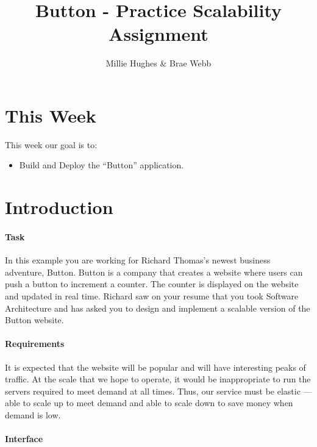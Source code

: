 \documentclass{csse4400}
\title{Button - Practice Scalability Assignment}
\author{Millie Hughes \& Brae Webb}
\date{\week{0}}
\begin{document}
\maketitle


\section{This Week}
This week our goal is to:
\begin{itemize}
  \item Build and Deploy the ``Button'' application.
\end{itemize}

\section{Introduction}

\paragraph{Task}

In this example you are working for Richard Thomas's newest business adventure, Button. Button is a company that creates a website where users can push a button to increment a counter. The counter is displayed on the website and updated in real time. Richard saw on your resume that you took Software Architecture and has asked you to design and implement a scalable version of the Button website.

\paragraph{Requirements}

It is expected that the website will be popular and will have interesting peaks of traffic. At the scale that we hope to operate, it would be inappropriate to run the servers required to meet demand at all times. Thus, our service must be elastic --- able to scale up to meet demand and able to scale down to save money when demand is low.

\paragraph{Interface}
\end{document}
